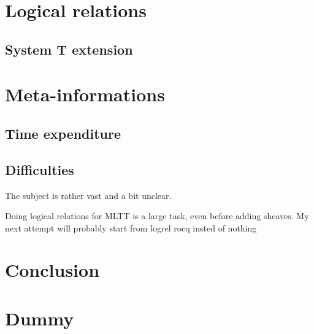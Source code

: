 \documentclass{article}
\newcommand{\0}{\mathbf{0}}
\newcommand{\1}{\mathbf{1}}
\begin{document}
\section{Logical relations}
\subsection{System T extension}



\section{Meta-informations}

\subsection{Time expenditure}


\subsection{Difficulties}

The subject is rather vast and a bit unclear.

Doing logical relations for MLTT is a large task, even before adding sheaves. My next attempt will probably start from logrel rocq insted of nothing


\section{Conclusion}



\newpage

\appendix
\appendixname

\section{Dummy}

\printbibliography
\end{document}
